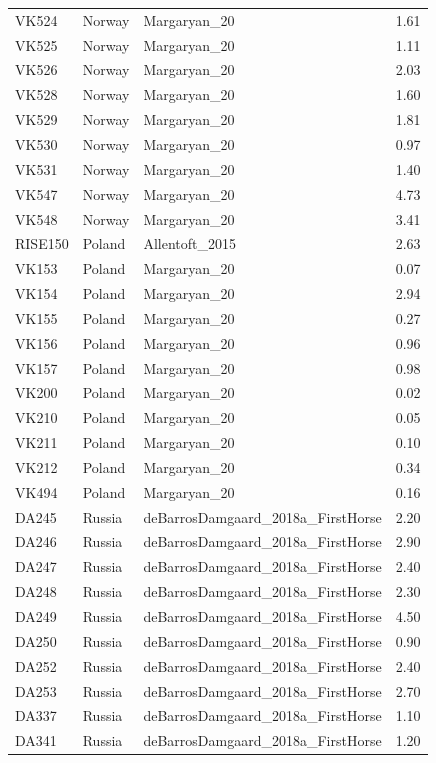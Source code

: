 \begin{longtable}[t]{lllr}
VK524 & Norway & Margaryan\_20 & 1.61\\
VK525 & Norway & Margaryan\_20 & 1.11\\
VK526 & Norway & Margaryan\_20 & 2.03\\
VK528 & Norway & Margaryan\_20 & 1.60\\
VK529 & Norway & Margaryan\_20 & 1.81\\
VK530 & Norway & Margaryan\_20 & 0.97\\
VK531 & Norway & Margaryan\_20 & 1.40\\
VK547 & Norway & Margaryan\_20 & 4.73\\
VK548 & Norway & Margaryan\_20 & 3.41\\
RISE150 & Poland & Allentoft\_2015 & 2.63\\
VK153 & Poland & Margaryan\_20 & 0.07\\
VK154 & Poland & Margaryan\_20 & 2.94\\
VK155 & Poland & Margaryan\_20 & 0.27\\
VK156 & Poland & Margaryan\_20 & 0.96\\
VK157 & Poland & Margaryan\_20 & 0.98\\
VK200 & Poland & Margaryan\_20 & 0.02\\
VK210 & Poland & Margaryan\_20 & 0.05\\
VK211 & Poland & Margaryan\_20 & 0.10\\
VK212 & Poland & Margaryan\_20 & 0.34\\
VK494 & Poland & Margaryan\_20 & 0.16\\
DA245 & Russia & deBarrosDamgaard\_2018a\_FirstHorse & 2.20\\
DA246 & Russia & deBarrosDamgaard\_2018a\_FirstHorse & 2.90\\
DA247 & Russia & deBarrosDamgaard\_2018a\_FirstHorse & 2.40\\
DA248 & Russia & deBarrosDamgaard\_2018a\_FirstHorse & 2.30\\
DA249 & Russia & deBarrosDamgaard\_2018a\_FirstHorse & 4.50\\
DA250 & Russia & deBarrosDamgaard\_2018a\_FirstHorse & 0.90\\
DA252 & Russia & deBarrosDamgaard\_2018a\_FirstHorse & 2.40\\
DA253 & Russia & deBarrosDamgaard\_2018a\_FirstHorse & 2.70\\
DA337 & Russia & deBarrosDamgaard\_2018a\_FirstHorse & 1.10\\
DA341 & Russia & deBarrosDamgaard\_2018a\_FirstHorse & 1.20\\

\end{longtable}
